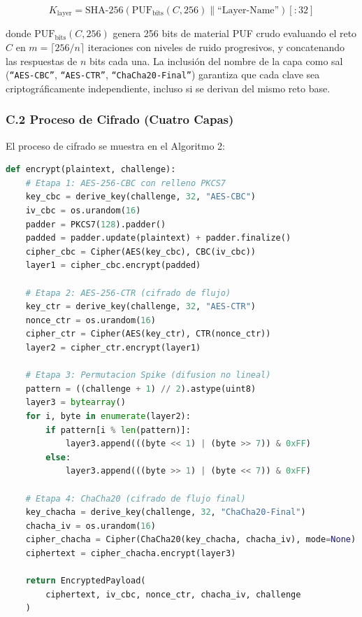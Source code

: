 \begin{equation}
    K_{\text{layer}} = \text{SHA-256}\left( \text{PUF}_{\text{bits}}(C, 256) \parallel \text{``Layer-Name''} \right)[:32]
    \label{eq:key_derivation}
\end{equation}

donde $\text{PUF}_{\text{bits}}(C, 256)$ genera 256 bits de material PUF crudo evaluando el reto $C$ en $m = \lceil 256/n \rceil$ iteraciones con niveles de ruido progresivos, y concatenando las respuestas de $n$ bits cada una. La inclusión del nombre de la capa como sal (\texttt{``AES-CBC''}, \texttt{``AES-CTR''}, \texttt{``ChaCha20-Final''}) garantiza que cada clave sea criptográficamente independiente, incluso si se derivan del mismo reto base.

\subsubsection*{C.2 Proceso de Cifrado (Cuatro Capas)}

El proceso de cifrado se muestra en el Algoritmo 2:

\begin{lstlisting}[language=Python, caption=Algoritmo de cifrado con AES-CBC + AES-CTR + Spike + ChaCha20, label=alg:encrypt]
def encrypt(plaintext, challenge):
    # Etapa 1: AES-256-CBC con relleno PKCS7
    key_cbc = derive_key(challenge, 32, "AES-CBC")
    iv_cbc = os.urandom(16)
    padder = PKCS7(128).padder()
    padded = padder.update(plaintext) + padder.finalize()
    cipher_cbc = Cipher(AES(key_cbc), CBC(iv_cbc))
    layer1 = cipher_cbc.encrypt(padded)

    # Etapa 2: AES-256-CTR (cifrado de flujo)
    key_ctr = derive_key(challenge, 32, "AES-CTR")
    nonce_ctr = os.urandom(16)
    cipher_ctr = Cipher(AES(key_ctr), CTR(nonce_ctr))
    layer2 = cipher_ctr.encrypt(layer1)

    # Etapa 3: Permutacion Spike (difusion no lineal)
    pattern = ((challenge + 1) // 2).astype(uint8)
    layer3 = bytearray()
    for i, byte in enumerate(layer2):
        if pattern[i % len(pattern)]:
            layer3.append(((byte << 1) | (byte >> 7)) & 0xFF)
        else:
            layer3.append(((byte >> 1) | (byte << 7)) & 0xFF)

    # Etapa 4: ChaCha20 (cifrado de flujo final)
    key_chacha = derive_key(challenge, 32, "ChaCha20-Final")
    chacha_iv = os.urandom(16)
    cipher_chacha = Cipher(ChaCha20(key_chacha, chacha_iv), mode=None)
    ciphertext = cipher_chacha.encrypt(layer3)

    return EncryptedPayload(
        ciphertext, iv_cbc, nonce_ctr, chacha_iv, challenge
    )
\end{lstlisting}

